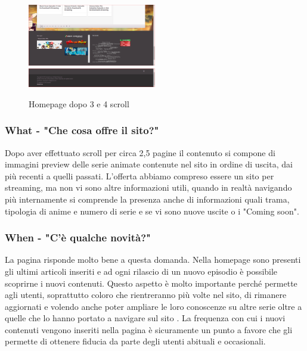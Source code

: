 \begin{figure}[H]
	\includegraphics[width=0.5\textwidth]{img/homepage04.png}
	\includegraphics[width=0.5\textwidth]{img/homepage05.png}
	\caption{Homepage dopo 3 e 4 scroll} 
	\label{img3} 
\end{figure}

\subsubsection{What - "Che cosa offre il sito?"} \label{HWhat}
Dopo aver effettuato scroll per circa 2,5 pagine il contenuto si compone di immagini preview delle serie animate contenute nel sito in ordine di uscita, dai più recenti a quelli passati. L'offerta abbiamo compreso essere un sito per streaming, ma non vi sono altre informazioni utili, quando in realtà navigando più internamente si comprende la presenza anche di informazioni quali trama, tipologia di anime e numero di serie e se vi sono nuove uscite o i "Coming soon".

\subsubsection{When - "C'è qualche novità?"} \label{HWhen}
La pagina risponde molto bene a questa domanda. Nella homepage sono presenti gli ultimi articoli inseriti e ad ogni rilascio di un nuovo episodio è possibile scoprirne i nuovi contenuti.
Questo aspetto è molto importante perché permette agli utenti, soprattutto coloro che rientreranno più volte nel sito, di rimanere aggiornati e volendo anche poter ampliare le loro conoscenze su altre serie oltre a quelle che lo hanno portato a navigare sul sito \nomeSito. La frequenza con cui i nuovi contenuti vengono inseriti nella pagina è sicuramente un punto a favore che gli permette di ottenere fiducia da parte degli utenti abituali e occasionali.

